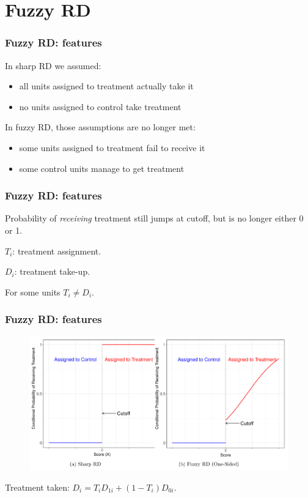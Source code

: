 \documentclass[12pt,english,dvipsnames,aspectratio=169,handout]{beamer}\usepackage[]{graphicx}\usepackage[]{xcolor}
\begin{document}
\section{Fuzzy RD}

\begin{frame}
\frametitle{Fuzzy RD: features}

In sharp RD we assumed:

\begin{itemize}
\item all units assigned to treatment actually take it
\item no units assigned to control take treatment
\end{itemize}\bigskip
\pause

In fuzzy RD, those assumptions are no longer met:

\begin{itemize}
\item some units assigned to treatment fail to receive it
\item some control units manage to get treatment
\end{itemize}

\end{frame}


\begin{frame}
\frametitle{Fuzzy RD: features}

Probability of \textit{receiving} treatment still jumps at cutoff, but is no longer either 0 or 1.\bigskip
\pause

$T_i$: treatment assignment.

$D_i$: treatment take-up.\bigskip
\pause

For some units $T_i \neq D_i$.

\end{frame}


\begin{frame}
\frametitle{Fuzzy RD: features}

\begin{figure}
\centering
\includegraphics[scale=0.4]{../04-figures/07/18.PNG}
\end{figure}

Treatment taken: $D_i = T_iD_{1i} + (1 - T_i)D_{0i}$.

\end{frame}
\end{document}

